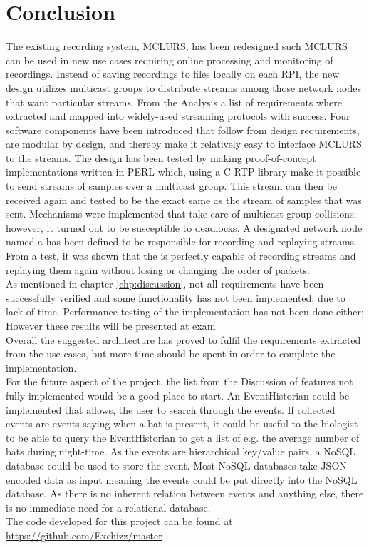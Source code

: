 \chapter{Conclusion}
The existing recording system, MCLURS, has been redesigned such MCLURS can be used in new use cases requiring online processing and monitoring of recordings. Instead of saving recordings to files locally on each RPI, the new design utilizes multicast groups to distribute streams among those network nodes that want particular streams. From the Analysis a list of requirements where extracted and mapped into widely-used streaming protocols with success. Four software components have been introduced that follow from design requirements, are modular by design, and thereby make it relatively easy to interface MCLURS to the streams. The design has been tested by making proof-of-concept implementations written in PERL which, using a C RTP library make it possible to send streams of samples over a multicast group. This stream can then be received again and tested to be the exact same as the stream of samples that was sent. Mechanisms were implemented that take care of multicast group collisions; however, it turned out to be susceptible to deadlocks. A designated network node named a \hist{} has been defined to be responsible for recording and replaying streams. From a test, it was shown that the \hist{} is perfectly capable of recording streams and replaying them again without losing or changing the order of packets. \\

\noindent{}As mentioned in chapter \ref{chp:discussion}, not all requirements have been successfully verified and some functionality has not been implemented, due to lack of time. Performance testing of the implementation has not been done either; However these results will be presented at exam\\

\noindent{} Overall the suggested architecture has proved to fulfil the requirements extracted from the use cases, but more time should be spent in order to complete the implementation.\\

\noindent{}For the future aspect of the project, the list from the Discussion of features not fully implemented would be a good place to start. An EventHistorian could be implemented that allows, the user to search through the events. If collected events are events saying when a bat is present, it could be useful to the biologist to be able to query the EventHistorian to get a list of e.g. the average number of bats during night-time. As the events are hierarchical key/value pairs, a NoSQL database could be used to store the event. Most NoSQL databases take JSON-encoded data as input meaning the events could be put directly into the NoSQL database. As  there is no inherent relation between events and anything else, there is no immediate need for a relational database.\\

\noindent{}The code developed for this project can be found at \url{https://github.com/Exchizz/master}

